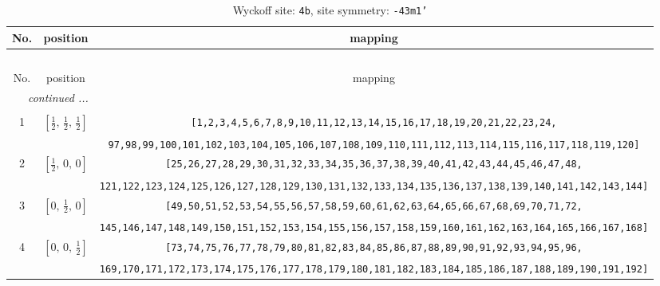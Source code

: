 \documentclass[fleqn,8pt]{jsarticle}
\begin{document}
\begin{longtable}{ccc}
\caption{Wyckoff site: {\tt 4b}, site symmetry: {\tt -43m1'}}
 \\
 \hline \hline
No. & position & mapping \\ \hline \endfirsthead

\multicolumn{2}{l}{\tablename\ \thetable{}} \\
 \hline \hline
No. & position & mapping \\ \hline \endhead

 \hline \hline
\multicolumn{2}{r}{\footnotesize\it continued ...} \\ \endfoot

 \hline \hline
\multicolumn{2}{r}{} \\ \endlastfoot

1 & $\left[ \frac{1}{2},\, \frac{1}{2},\, \frac{1}{2} \right]$ & {\tt [1,2,3,4,5,6,7,8,9,10,11,12,13,14,15,16,17,18,19,20,21,22,23,24,} \\ \hline
 &  & {\tt 97,98,99,100,101,102,103,104,105,106,107,108,109,110,111,112,113,114,115,116,117,118,119,120]} \\ \hline
2 & $\left[ \frac{1}{2},\, 0,\, 0 \right]$ & {\tt [25,26,27,28,29,30,31,32,33,34,35,36,37,38,39,40,41,42,43,44,45,46,47,48,} \\ \hline
 &  & {\tt 121,122,123,124,125,126,127,128,129,130,131,132,133,134,135,136,137,138,139,140,141,142,143,144]} \\ \hline
3 & $\left[ 0,\, \frac{1}{2},\, 0 \right]$ & {\tt [49,50,51,52,53,54,55,56,57,58,59,60,61,62,63,64,65,66,67,68,69,70,71,72,} \\ \hline
 &  & {\tt 145,146,147,148,149,150,151,152,153,154,155,156,157,158,159,160,161,162,163,164,165,166,167,168]} \\ \hline
4 & $\left[ 0,\, 0,\, \frac{1}{2} \right]$ & {\tt [73,74,75,76,77,78,79,80,81,82,83,84,85,86,87,88,89,90,91,92,93,94,95,96,} \\ \hline
 &  & {\tt 169,170,171,172,173,174,175,176,177,178,179,180,181,182,183,184,185,186,187,188,189,190,191,192]} \\
\end{longtable}
\renewcommand{\arraystretch}{1.2}
\end{document}
